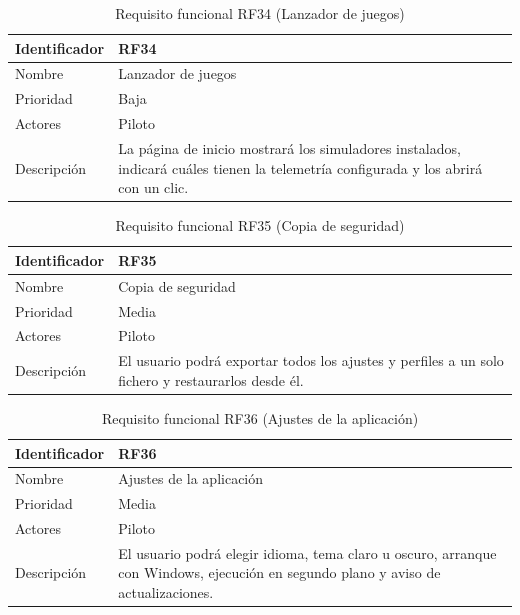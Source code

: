 \begin{table}[H]
	\centering
	\renewcommand{\arraystretch}{2}
	\begin{tabular}{|l|p{10cm}|}
		\hline
		Identificador & RF34 \\
		\hline
		Nombre & Lanzador de juegos \\
		\hline
		Prioridad & Baja \\
		\hline
		Actores & Piloto \\
		\hline
		Descripción & La página de inicio mostrará los simuladores instalados, indicará cuáles tienen la telemetría configurada y los abrirá con un clic. \\
		\hline
	\end{tabular}
	\caption{Requisito funcional RF34 (Lanzador de juegos)}
	\label{tab:rf34}
\end{table}

\begin{table}[H]
	\centering
	\renewcommand{\arraystretch}{2}
	\begin{tabular}{|l|p{10cm}|}
		\hline
		Identificador & RF35 \\
		\hline
		Nombre & Copia de seguridad \\
		\hline
		Prioridad & Media \\
		\hline
		Actores & Piloto \\
		\hline
		Descripción & El usuario podrá exportar todos los ajustes y perfiles a un solo fichero y restaurarlos desde él. \\
		\hline
	\end{tabular}
	\caption{Requisito funcional RF35 (Copia de seguridad)}
	\label{tab:rf35}
\end{table}

\begin{table}[H]
	\centering
	\renewcommand{\arraystretch}{2}
	\begin{tabular}{|l|p{10cm}|}
		\hline
		Identificador & RF36 \\
		\hline
		Nombre & Ajustes de la aplicación \\
		\hline
		Prioridad & Media \\
		\hline
		Actores & Piloto \\
		\hline
		Descripción & El usuario podrá elegir idioma, tema claro u oscuro, arranque con Windows, ejecución en segundo plano y aviso de actualizaciones. \\
		\hline
	\end{tabular}
	\caption{Requisito funcional RF36 (Ajustes de la aplicación)}
	\label{tab:rf36}
\end{table}

